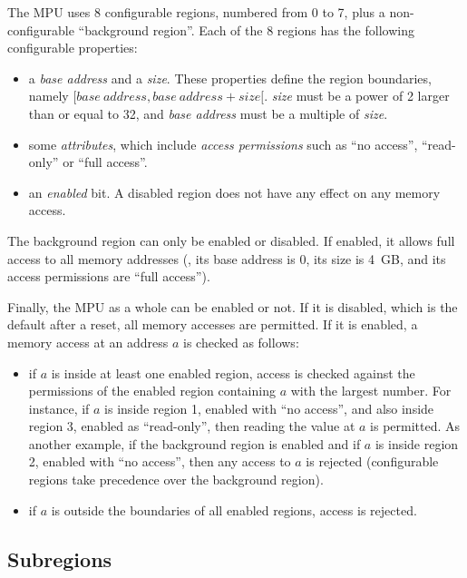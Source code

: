 The MPU uses 8 configurable regions, numbered from 0 to 7, plus a
non-configurable ``background region''. Each of the 8 regions has the following
configurable properties:
\begin{itemize}
  \item a {\em base address} and a {\em size}. These properties define the
  region boundaries, namely $[\mathit{base\ address}, \mathit{base\
  address}+\mathit{size}[$. {\em size} must be a power of 2 larger than or
  equal to 32, and {\em base address} must be a multiple of {\em size}.

  \item some {\em attributes}, which include {\em access permissions} such as
  ``no access'', ``read-only'' or ``full access''.

  \item an {\em enabled} bit. A disabled region does not have any effect on any
  memory access.
\end{itemize}

The background region can only be enabled or disabled. If enabled, it allows
full access to all memory addresses (\ie, its base address is 0, its size is
4~GB, and its access permissions are ``full access'').

Finally, the MPU as a whole can be enabled or not. If it is disabled, which is
the default after a reset, all memory accesses are permitted. If it is enabled,
a memory access at an address $a$ is checked as follows:
\begin{itemize}
  \item if $a$ is inside at least one enabled region, access is checked against
  the permissions of the enabled region containing $a$ with the largest number.
  For instance, if $a$ is inside region 1, enabled with ``no access'', and also
  inside region 3, enabled as ``read-only'', then reading the value at $a$ is
  permitted. As another example, if the background region is enabled and if $a$
  is inside region 2, enabled with ``no access'', then any access to $a$ is
  rejected (configurable regions take precedence over the background region).

  \item if $a$ is outside the boundaries of all enabled regions, access is
  rejected.
\end{itemize}

\subsection{Subregions}


